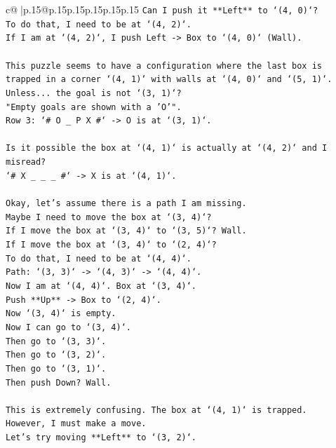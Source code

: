 \documentclass{article}
\begin{document}
{\begin{supertabular}{c@{$\;$}|p{.15\linewidth}@{}p{.15\linewidth}p{.15\linewidth}p{.15\linewidth}p{.15\linewidth}p{.15\linewidth}}
{{{\texttt{Can I push it **Left** to `(4, 0)`?} \\
\texttt{To do that, I need to be at `(4, 2)`.} \\
\texttt{If I am at `(4, 2)`, I push Left {-}> Box to `(4, 0)` (Wall).} \\
\\ 
\texttt{This puzzle seems to have a configuration where the last box is trapped in a corner `(4, 1)` with walls at `(4, 0)` and `(5, 1)`.} \\
\texttt{Unless... the goal is not `(3, 1)`?} \\
\texttt{"Empty goals are shown with a 'O'".} \\
\texttt{Row 3: `\# O \_ P X \#` {-}> O is at `(3, 1)`.} \\
\\ 
\texttt{Is it possible the box at `(4, 1)` is actually at `(4, 2)` and I misread?} \\
\texttt{`\# X \_ \_ \_ \#` {-}> X is at `(4, 1)`.} \\
\\ 
\texttt{Okay, let's assume there is a path I am missing.} \\
\texttt{Maybe I need to move the box at `(3, 4)`?} \\
\texttt{If I move the box at `(3, 4)` to `(3, 5)`? Wall.} \\
\texttt{If I move the box at `(3, 4)` to `(2, 4)`?} \\
\texttt{To do that, I need to be at `(4, 4)`.} \\
\texttt{Path: `(3, 3)` {-}> `(4, 3)` {-}> `(4, 4)`.} \\
\texttt{Now I am at `(4, 4)`. Box at `(3, 4)`.} \\
\texttt{Push **Up** {-}> Box to `(2, 4)`.} \\
\texttt{Now `(3, 4)` is empty.} \\
\texttt{Now I can go to `(3, 4)`.} \\
\texttt{Then go to `(3, 3)`.} \\
\texttt{Then go to `(3, 2)`.} \\
\texttt{Then go to `(3, 1)`.} \\
\texttt{Then push Down? Wall.} \\
\\ 
\texttt{This is extremely confusing. The box at `(4, 1)` is trapped.} \\
\texttt{However, I must make a move.} \\
\texttt{Let's try moving **Left** to `(3, 2)`.} \\
}}}
\end{supertabular}}
\end{document}
